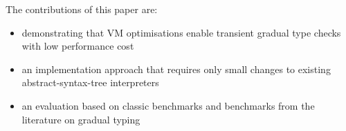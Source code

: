 
The contributions of this paper are:

\begin{itemize}
\item demonstrating that VM optimisations enable
        transient gradual type checks with low performance cost
\item an implementation approach that requires
      only small changes to existing abstract-syntax-tree interpreters
\item an evaluation based on classic benchmarks
      and benchmarks from the literature on gradual typing
\end{itemize}
